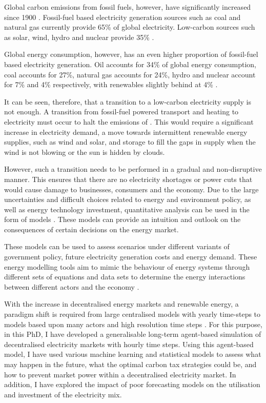 Global carbon emissions from fossil fuels, however, have significantly increased since 1900 \cite{boden2017global}.    Fossil-fuel based electricity generation sources such as coal and natural gas currently provide 65\% of global electricity. Low-carbon sources such as solar, wind, hydro and nuclear provide 35\% \cite{BP2018}. 

Global energy consumption, however, has an even higher proportion of fossil-fuel based electricity generation. Oil accounts for 34\% of global energy consumption, coal accounts for 27\%, natural gas accounts for 24\%, hydro and nuclear account for 7\% and 4\% respectively, with renewables slightly behind at 4\% \cite{BPReview}. 

It can be seen, therefore, that a transition to a low-carbon electricity supply is not enough. A transition from fossil-fuel powered transport and heating to electricity must occur to halt the emissions of . This would require a significant increase in electricity demand, a move towards intermittent renewable energy supplies, such as wind and solar, and storage to fill the gaps in supply when the wind is not blowing or the sun is hidden by clouds. 

However, such a transition needs to be performed in a gradual and non-disruptive manner. This ensures that there are no electricity shortages or power cuts that would cause damage to businesses, consumers and the economy. Due to the large uncertainties and difficult choices related to energy and environment policy, as well as energy technology investment, quantitative analysis can be used in the form of models \cite{DeCarolis2012}. These models can provide an intuition and outlook on the consequences of certain decisions on the energy market.

These models can be used to assess scenarios under different variants of government policy, future electricity generation costs and energy demand. These energy modelling tools aim to mimic the behaviour of energy systems through different sets of equations and data sets to determine the energy interactions between different actors and the economy \cite{Machado2019}.

With the increase in decentralised energy markets and renewable energy, a paradigm shift is required from large centralised models with yearly time-steps to models based upon many actors and high resolution time steps \cite{Ringkjob2018, Pfenninger2014b}. For this purpose, in this PhD, I have developed a generalisable long-term agent-based simulation of decentralised electricity markets with hourly time steps. Using this agent-based model, I have used various machine learning and statistical models to assess what may happen in the future, what the optimal carbon tax strategies could be, and how to prevent market power within a decentralised electricity market. In addition, I have explored the impact of poor forecasting models on the utilisation and investment of the electricity mix. 

